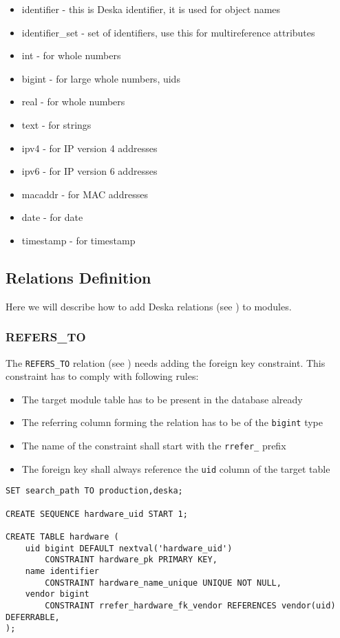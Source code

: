 \documentclass[deska]{subfiles}
\begin{document}
\begin{itemize}
	\item{identifier} - this is Deska identifier, it is used for object names
	\item{identifier\_set} - set of identifiers, use this for multireference attributes
	\item{int} - for whole numbers
	\item{bigint} - for large whole numbers, uids
	\item{real} - for whole numbers
	\item{text} - for strings
	\item{ipv4} - for IP version 4 addresses
	\item{ipv6} - for IP version 6 addresses
	\item{macaddr} - for MAC addresses
	\item{date} - for date
	\item{timestamp} - for timestamp
\end{itemize}

\subsection{Relations Definition}
Here we will describe how to add Deska relations (see ) to modules.

\subsubsection{REFERS\_TO}
\label{sec:db-scheme-refers-to}

The {\tt REFERS\_TO} relation (see ) needs adding the foreign key constraint. This constraint has to comply with following rules:

\begin{itemize}
    \item The target module table has to be present in the database already
    \item The referring column forming the relation has to be of the {\tt bigint} type
    \item The name of the constraint shall start with the {\tt rrefer\_} prefix
    \item The foreign key shall always reference the {\tt uid} column of the target table
\end{itemize}

\begin{verbatim}
SET search_path TO production,deska;

CREATE SEQUENCE hardware_uid START 1;

CREATE TABLE hardware (
    uid bigint DEFAULT nextval('hardware_uid')
        CONSTRAINT hardware_pk PRIMARY KEY,
    name identifier
        CONSTRAINT hardware_name_unique UNIQUE NOT NULL,
    vendor bigint 
        CONSTRAINT rrefer_hardware_fk_vendor REFERENCES vendor(uid) DEFERRABLE,
);
\end{verbatim}
\end{document}
